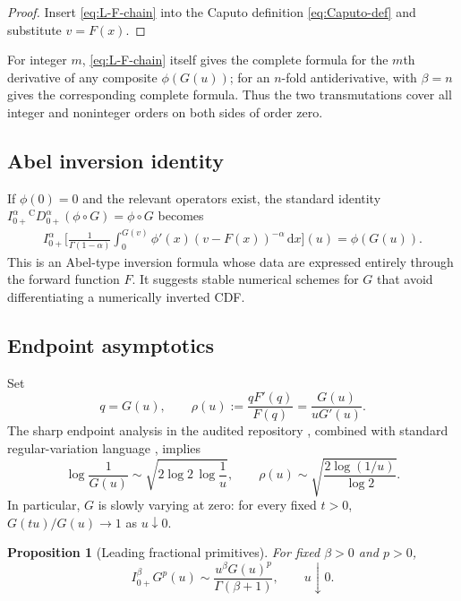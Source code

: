 \documentclass[11pt,oneside]{article}
\newtheorem{proposition}[theorem]{Proposition}
\theoremstyle{definition}
\theoremstyle{remark}
\newcommand{\dd}{\,\mathrm d}
\newcommand{\Caputo}{\mathrm C}
\begin{document}
\begin{proof}
Insert \eqref{eq:L-F-chain} into the Caputo definition
\eqref{eq:Caputo-def} and substitute $v=F(x)$.
\end{proof}

For integer $m$, \eqref{eq:L-F-chain} itself gives the complete formula for
the $m$th derivative of any composite $\phi(G(u))$; for an $n$-fold
antiderivative,  with $\beta=n$ gives the
corresponding complete formula.  Thus the two transmutations cover all
integer and noninteger orders on both sides of order zero.

\subsection{Abel inversion identity}

If $\phi(0)=0$ and the relevant operators exist, the standard identity
$I_{0+}^{\alpha}{}^{\Caputo}D_{0+}^{\alpha}(\phi\circ G)=\phi\circ G$ becomes
\begin{align}
 I_{0+}^{\alpha}\Bigg[
 \frac1{\Gamma(1-\alpha)}
 \int_0^{G(v)}\phi'(x)(v-F(x))^{-\alpha}\dd x
 \Bigg](u)
 =\phi(G(u)).
 \label{eq:Abel-inversion-quantile}
\end{align}
This is an Abel-type inversion formula whose data are expressed entirely
through the forward function $F$.  It suggests stable numerical schemes for
$G$ that avoid differentiating a numerically inverted CDF.

\subsection{Endpoint asymptotics}

Set
\begin{equation}
 q=G(u),
 \qquad
 \rho(u):=\frac{qF'(q)}{F(q)}
 =\frac{G(u)}{uG'(u)}.
 \label{eq:rho-def}
\end{equation}
The sharp endpoint analysis in the audited repository \cite{ProveIt},
combined with standard regular-variation language \cite{BGT}, implies
\begin{equation}
 \log\frac1{G(u)}
 \sim\sqrt{2\log 2\,\log\frac1u},
 \qquad
 \rho(u)\sim
 \sqrt{\frac{2\log(1/u)}{\log2}}.
 \label{eq:G-leading-endpoint}
\end{equation}
In particular, $G$ is slowly varying at zero: for every fixed $t>0$,
$G(tu)/G(u)\to1$ as $u\downarrow0$.

\begin{proposition}[Leading fractional primitives]
\label{prop:leading-RL-G}
For fixed $\beta>0$ and $p>0$,
\begin{equation}
 I_{0+}^{\beta}G^p(u)
 \sim\frac{u^\beta G(u)^p}{\Gamma(\beta+1)},
 \qquad u\downarrow0.
 \label{eq:RL-G-leading}
\end{equation}
\end{proposition}
\end{document}
